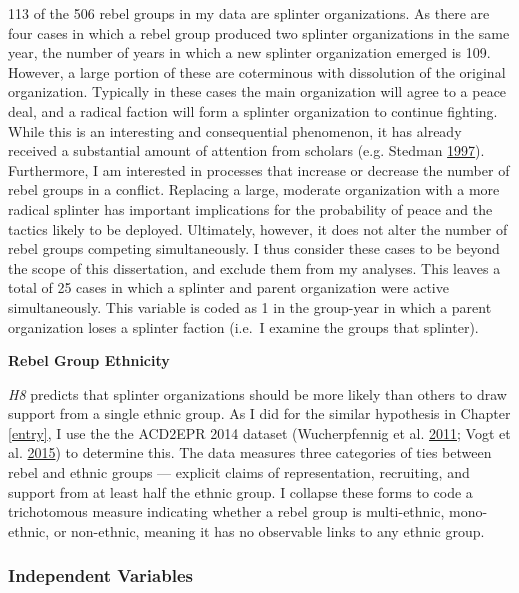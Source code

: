 \documentclass[12pt,]{book}
\theoremstyle{definition}
\theoremstyle{definition}
\theoremstyle{remark}
\begin{document}
113 of the 506 rebel groups in my data are splinter organizations. As
there are four cases in which a rebel group produced two splinter
organizations in the same year, the number of years in which a new
splinter organization emerged is 109. However, a large portion of these
are coterminous with dissolution of the original organization. Typically
in these cases the main organization will agree to a peace deal, and a
radical faction will form a splinter organization to continue fighting.
While this is an interesting and consequential phenomenon, it has
already received a substantial amount of attention from scholars (e.g.
Stedman \protect\hyperlink{ref-Stedman1997}{1997}). Furthermore, I am
interested in processes that increase or decrease the number of rebel
groups in a conflict. Replacing a large, moderate organization with a
more radical splinter has important implications for the probability of
peace and the tactics likely to be deployed. Ultimately, however, it
does not alter the number of rebel groups competing simultaneously. I
thus consider these cases to be beyond the scope of this dissertation,
and exclude them from my analyses. This leaves a total of 25 cases in
which a splinter and parent organization were active simultaneously.
This variable is coded as 1 in the group-year in which a parent
organization loses a splinter faction (i.e.~I examine the groups that
splinter).

\textbf{Rebel Group Ethnicity}

\emph{H8} predicts that splinter organizations should be more likely
than others to draw support from a single ethnic group. As I did for the
similar hypothesis in Chapter \ref{entry}, I use the the ACD2EPR 2014
dataset (Wucherpfennig et al.
\protect\hyperlink{ref-Wucherpfennig2011}{2011}; Vogt et al.
\protect\hyperlink{ref-Vogt2015}{2015}) to determine this. The data
measures three categories of ties between rebel and ethnic groups ---
explicit claims of representation, recruiting, and support from at least
half the ethnic group. I collapse these forms to code a trichotomous
measure indicating whether a rebel group is multi-ethnic, mono-ethnic,
or non-ethnic, meaning it has no observable links to any ethnic group.

\subsubsection*{Independent Variables}\label{independent-variables}
\end{document}
